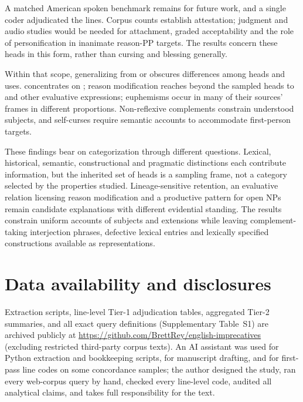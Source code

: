 \documentclass[12pt]{article}
\newif\ifblind
\begin{document}
A matched American spoken benchmark remains for future work, and a single coder adjudicated the lines. Corpus counts establish attestation; judgment and audio studies would be needed for attachment, graded acceptability and the role of personification in inanimate reason-PP targets. The results concern these heads in this form, rather than cursing and blessing generally.

Within that scope, generalizing from  or  obscures differences among heads and uses.  concentrates on ; reason modification reaches beyond the sampled heads to  and other evaluative expressions; euphemisms occur in many of their sources' frames in different proportions. Non-reflexive complements constrain understood subjects, and self-curses require semantic accounts to accommodate first-person targets.

These findings bear on categorization through different questions. Lexical, historical, semantic, constructional and pragmatic distinctions each contribute information, but the inherited set of heads is a sampling frame, not a category selected by the properties studied. Lineage-sensitive retention, an evaluative relation licensing reason modification and a productive pattern for open NPs remain candidate explanations with different evidential standing. The results constrain uniform accounts of subjects and extensions while leaving complement-taking interjection phrases, defective lexical entries and lexically specified constructions available as representations.

\section*{Data availability and disclosures}
\ifblind
Extraction scripts, line-level Tier-1 adjudication tables, parsed Tier-2 frequency summaries, and all exact query definitions (Supplementary Table~S1) will be archived in an anonymized repository for review and publicly upon acceptance, excluding restricted third-party corpus texts. An AI assistant was used for Python extraction and bookkeeping scripts, for manuscript drafting, and for first-pass line codes on some concordance samples; the author designed the study, ran every web-corpus query by hand, checked every line-level code, audited all analytical claims, and takes full responsibility for the text.
\else
Extraction scripts, line-level Tier-1 adjudication tables, aggregated Tier-2 summaries, and all exact query definitions (Supplementary Table~S1) are archived publicly at \url{https://github.com/BrettRey/english-imprecatives} (excluding restricted third-party corpus texts). An AI assistant was used for Python extraction and bookkeeping scripts, for manuscript drafting, and for first-pass line codes on some concordance samples; the author designed the study, ran every web-corpus query by hand, checked every line-level code, audited all analytical claims, and takes full responsibility for the text.
\fi

\clearpage
\printbibliography
\end{document}
